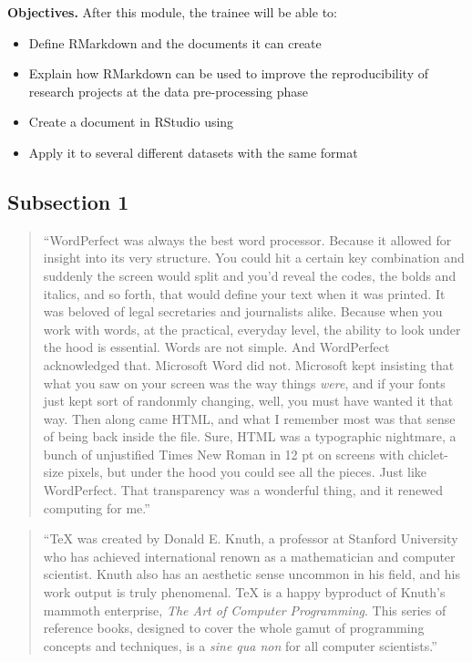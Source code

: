 \documentclass[]{tufte-book}
\providecommand{\tightlist}{%
  \setlength{\itemsep}{0pt}\setlength{\parskip}{0pt}}
\begin{document}
\textbf{Objectives.} After this module, the trainee will be able to:

\begin{itemize}
\tightlist
\item
  Define RMarkdown and the documents it can create
\item
  Explain how RMarkdown can be used to improve the reproducibility of research
  projects at the data pre-processing phase
\item
  Create a document in RStudio using
\item
  Apply it to several different datasets with the same format
\end{itemize}

\hypertarget{subsection-1}{%
\subsection{Subsection 1}\label{subsection-1}}

\begin{quote}
``WordPerfect was always the best word processor. Because it allowed for insight into
its very structure. You could hit a certain key combination and suddenly the screen
would split and you'd reveal the codes, the bolds and italics, and so forth,
that would define your text when it was printed. It was beloved of legal secretaries
and journalists alike. Because when you work with words, at the practical, everyday
level, the ability to look under the hood is essential. Words are not simple. And
WordPerfect acknowledged that. Microsoft Word did not. Microsoft kept insisting that
what you saw on your screen was the way things \emph{were}, and if your fonts just kept
sort of randonmly changing, well, you must have wanted it that way. Then along came
HTML, and what I remember most was that sense of being back inside the file. Sure,
HTML was a typographic nightmare, a bunch of unjustified Times New Roman in 12 pt on
screens with chiclet-size pixels, but under the hood you could see all the pieces.
Just like WordPerfect. That transparency was a wonderful thing, and it renewed
computing for me.'' \citep{ford2015on}
\end{quote}

\begin{quote}
``TeX was created by Donald E. Knuth, a professor at Stanford University who has
achieved international renown as a mathematician and computer scientist.
Knuth also has an aesthetic sense uncommon in his field, and his work output is
truly phenomenal. TeX is a happy byproduct of Knuth's mammoth enterprise,
\emph{The Art of Computer Programming}. This series of reference books, designed
to cover the whole gamut of programming concepts and techniques, is a
\emph{sine qua non} for all computer scientists.'' \citep{seroul2012beginner}
\end{quote}
\end{document}
